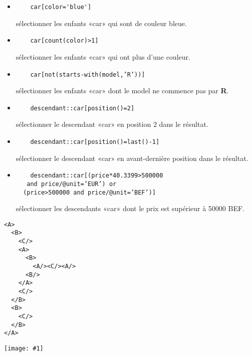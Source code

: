 \documentclass{article}
\newcommand{\imageR}[2]{\texttt{[image: \#1]}}
\begin{document}
\begin{itemize}
\item  \begin{multicols}{2}
	\begin{verbatim}
	car[color='blue']
	\end{verbatim}
	sélectionner les enfants «car» qui sont de couleur bleue.
	\end{multicols}
\item  \begin{multicols}{2}
	\begin{verbatim}
	car[count(color)>1] 
	\end{verbatim}
	sélectionner les enfants «car» qui ont plus d'une couleur.
	\end{multicols}
\item  \begin{multicols}{2}
	\begin{verbatim}
	car[not(starts-with(model,’R’))]	
	\end{verbatim}
	sélectionner les enfants «car» dont le model ne commence pas par \textbf{R}.
	\end{multicols}
\item  \begin{multicols}{2}
	\begin{verbatim}
	descendant::car[position()=2]
	\end{verbatim}
	sélectionner le descendant «car» en position $2$ dans le résultat.
	\end{multicols}
\item  \begin{multicols}{2}
	\begin{verbatim}
	descendant::car[position()=last()-1]
	\end{verbatim}
	sélectionner le descendant «car» en avant-dernière position dans le résultat.
	\end{multicols}
\item  \begin{multicols}{2}
	\begin{verbatim}
	descendant::car[(price*40.3399>500000 
   and price/@unit=’EUR’) or
  (price>500000 and price/@unit=’BEF’)]
	\end{verbatim}
	sélectionner les descendants «car» dont le prix est supérieur à 50000 BEF.
	\end{multicols}
\end{itemize}

\begin{multicols}{2}
\begin{verbatim}
<A>
  <B>
    <C/>
    <A>
      <B>
        <A/><C/><A/>
      <B/>
    </A>
    <C/>
  </B>
  <B>
    <C/>
  </B>
</A>
\end{verbatim}
\imageR{CAPT_002.png}{250}
\end{multicols}
\end{document}
